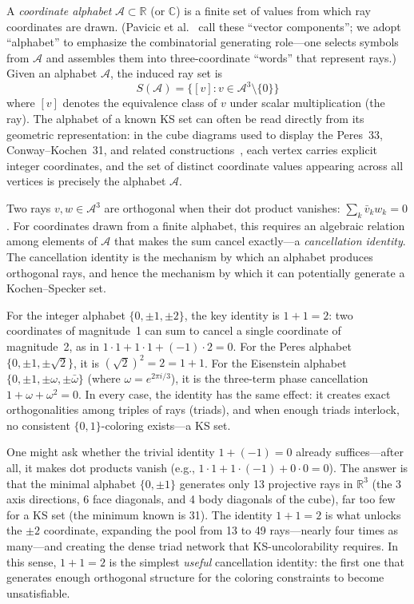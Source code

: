 \documentclass[12pt,a4paper]{article}
\newcommand{\R}{\mathbb{R}}
\newcommand{\C}{\mathbb{C}}
\begin{document}
A \emph{coordinate alphabet} $\mathcal{A} \subset \R$ (or $\C$) is a finite set of values from which ray coordinates are drawn.  (Pavicic et al.~\cite{Pavicic2019} call these ``vector components''; we adopt ``alphabet'' to emphasize the combinatorial generating role---one selects symbols from $\mathcal{A}$ and assembles them into three-coordinate ``words'' that represent rays.)  Given an alphabet $\mathcal{A}$, the induced ray set is
\[
S(\mathcal{A}) = \{ [v] : v \in \mathcal{A}^3 \setminus \{0\} \}
\]
where $[v]$ denotes the equivalence class of $v$ under scalar multiplication (the ray).  The alphabet of a known KS set can often be read directly from its geometric representation: in the cube diagrams used to display the Peres~33, Conway--Kochen~31, and related constructions~\cite{Peres1991,Peres1993}, each vertex carries explicit integer coordinates, and the set of distinct coordinate values appearing across all vertices is precisely the alphabet $\mathcal{A}$.

Two rays $v, w \in \mathcal{A}^3$ are orthogonal when their dot product vanishes: $\sum_k \bar v_k w_k = 0$.  For coordinates drawn from a finite alphabet, this requires an algebraic relation among elements of $\mathcal{A}$ that makes the sum cancel exactly---a \emph{cancellation identity}.  The cancellation identity is the mechanism by which an alphabet produces orthogonal rays, and hence the mechanism by which it can potentially generate a Kochen--Specker set.

For the integer alphabet $\{0, \pm 1, \pm 2\}$, the key identity is $1 + 1 = 2$: two coordinates of magnitude~1 can sum to cancel a single coordinate of magnitude~2, as in $1 \cdot 1 + 1 \cdot 1 + (-1) \cdot 2 = 0$.  For the Peres alphabet $\{0, \pm 1, \pm\sqrt{2}\}$, it is $(\sqrt{2})^2 = 2 = 1 + 1$.  For the Eisenstein alphabet $\{0, \pm 1, \pm\omega, \pm\bar\omega\}$ (where $\omega = e^{2\pi i/3}$), it is the three-term phase cancellation $1 + \omega + \omega^2 = 0$.  In every case, the identity has the same effect: it creates exact orthogonalities among triples of rays (triads), and when enough triads interlock, no consistent $\{0,1\}$-coloring exists---a KS set.

One might ask whether the trivial identity $1 + (-1) = 0$ already suffices---after all, it makes dot products vanish (e.g., $1 \cdot 1 + 1 \cdot (-1) + 0 \cdot 0 = 0$).  The answer is that the minimal alphabet $\{0, \pm 1\}$ generates only 13 projective rays in $\R^3$ (the 3 axis directions, 6 face diagonals, and 4 body diagonals of the cube), far too few for a KS set (the minimum known is 31).  The identity $1 + 1 = 2$ is what unlocks the $\pm 2$ coordinate, expanding the pool from 13 to 49 rays---nearly four times as many---and creating the dense triad network that KS-uncolorability requires.  In this sense, $1 + 1 = 2$ is the simplest \emph{useful} cancellation identity: the first one that generates enough orthogonal structure for the coloring constraints to become unsatisfiable.
\end{document}
